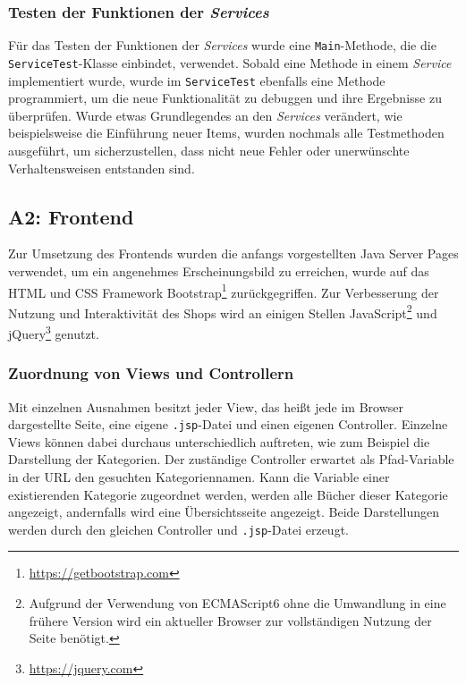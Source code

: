 		\subsubsection{Testen der Funktionen der \textit{Services}}
		Für das Testen der Funktionen der \textit{Services} wurde eine \texttt{Main}-Methode, die die \texttt{Service\-Test}-Klasse einbindet, verwendet. Sobald eine Methode in einem \textit{Service} implementiert wurde, wurde im \texttt{Service\-Test} ebenfalls eine Methode programmiert, um die neue Funktionalität zu debuggen und ihre Ergebnisse zu überprüfen. Wurde etwas Grundlegendes an den \textit{Services} verändert, wie beispielsweise die Einführung neuer Items, wurden nochmals alle Testmethoden ausgeführt, um sicherzustellen, dass nicht neue Fehler oder unerwünschte Verhaltensweisen entstanden sind.
		
	\subsection{A2: Frontend}
	Zur Umsetzung des Frontends wurden die anfangs vorgestellten Java Server Pages verwendet, um ein angenehmes Erscheinungsbild zu erreichen, wurde auf das HTML und CSS Framework Bootstrap\footnote{\hyperlink{https://getbootstrap.com}{https://getbootstrap.com}} zurückgegriffen. Zur Verbesserung der Nutzung und Interaktivität des Shops wird an einigen Stellen JavaScript\footnote{Aufgrund der Verwendung von ECMAScript6 ohne die Umwandlung in eine frühere Version wird ein aktueller Browser zur vollständigen Nutzung der Seite benötigt.} und jQuery\footnote{\hyperlink{https://jquery.com}{https://jquery.com}} genutzt.
	
		\subsubsection{Zuordnung von Views und Controllern}	
		Mit einzelnen Ausnahmen besitzt jeder View, das heißt jede im Browser dargestellte Seite, eine eigene \lstinline|.jsp|-Datei und einen eigenen Controller. Einzelne Views können dabei durchaus unterschiedlich auftreten, wie zum Beispiel die Darstellung der Kategorien. Der zuständige Controller erwartet als Pfad-Variable in der URL den gesuchten Kategoriennamen. Kann die Variable einer existierenden Kategorie zugeordnet werden, werden alle Bücher dieser Kategorie angezeigt, andernfalls wird eine Übersichtsseite angezeigt. Beide Darstellungen werden durch den gleichen Controller und \lstinline|.jsp|-Datei erzeugt.
		
